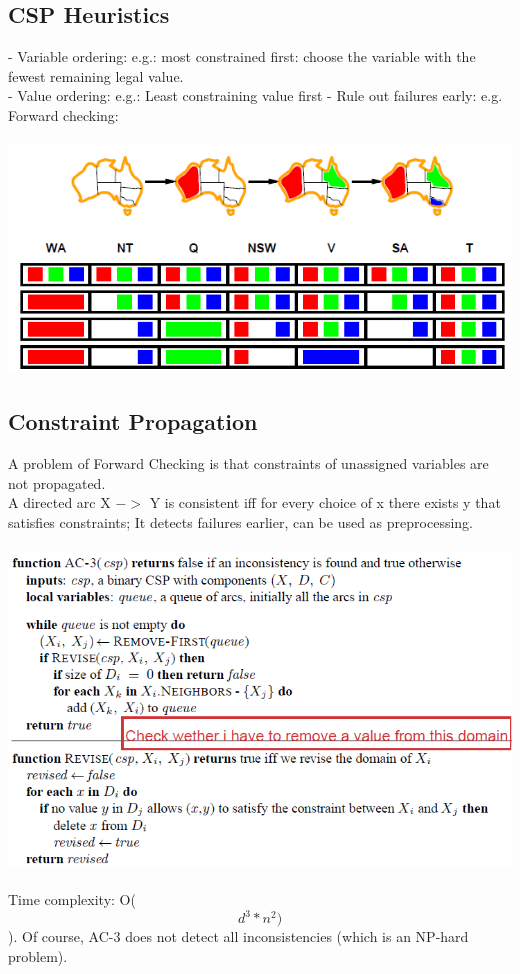 \documentclass{article}
\begin{document}
\subsection{CSP Heuristics}
- Variable ordering: e.g.: most constrained first: choose the variable with the fewest remaining legal value.\\
- Value ordering: e.g.: Least constraining value first
- Rule out failures early: e.g. Forward checking:\\\\
\includegraphics[scale=0.6]{26.png}
\subsection{Constraint Propagation}
A problem of Forward Checking is that constraints of unassigned variables are not propagated.\\
A directed arc X $->$ Y is consistent iff for every choice of x there exists y that satisfies constraints; It detects failures earlier, can be used as preprocessing.\\\\
\includegraphics[scale=0.6]{27.png}\\\\
Time complexity: O(\[d^3 * n^2)\]). Of course, AC-3 does not detect all inconsistencies (which is an NP-hard problem).
\end{document}

